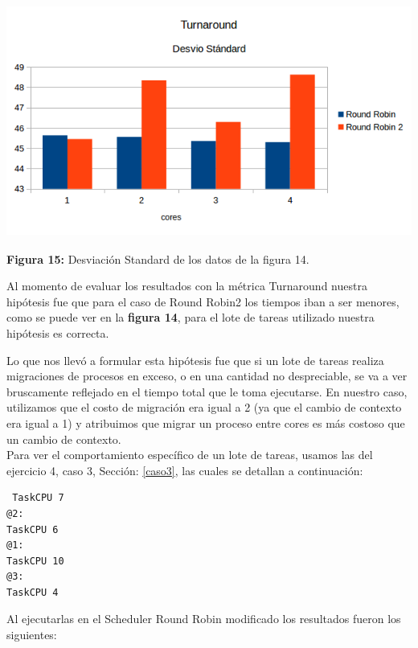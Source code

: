 \documentclass[a4paper]{article}
\begin{document}
\includegraphics[width=\textwidth,height=3.0in,keepaspectratio
]{imagenes/ej8/tads.png} \\
\begin {flushleft}
\textbf{Figura 15:} Desviación Standard de los datos de la figura 14.
\end{flushleft}	

Al momento de evaluar los resultados con la métrica Turnaround nuestra hipótesis fue que para el caso de Round Robin2 los tiempos iban a ser menores, como se puede ver en la \textbf{figura 14}, para el lote de tareas utilizado nuestra hipótesis es correcta. 

Lo que nos llevó a formular esta hipótesis fue que si un lote de tareas realiza migraciones de procesos en exceso, o en una cantidad no despreciable, se va a ver bruscamente reflejado en el tiempo total que le toma ejecutarse. En nuestro caso, utilizamos que el costo de migración era igual a 2 (ya que el cambio de contexto era igual a 1) y atribuimos que migrar un proceso entre cores es m\'as costoso que un cambio de contexto.\\

 Para ver el comportamiento espec\'ifico de un lote de tareas, usamos las del ejercicio 4, caso 3, Secci\'on: \ref{caso3}, las cuales se detallan a continuaci\'on:


 \begin{codesnippet}
	\begin{verbatim}
 TaskCPU 7
@2:
TaskCPU 6
@1:
TaskCPU 10
@3:
TaskCPU 4
	\end{verbatim}
	\end{codesnippet}
	
Al ejecutarlas en el Scheduler Round Robin modificado los resultados fueron los siguientes:\\
	
\end{document}
